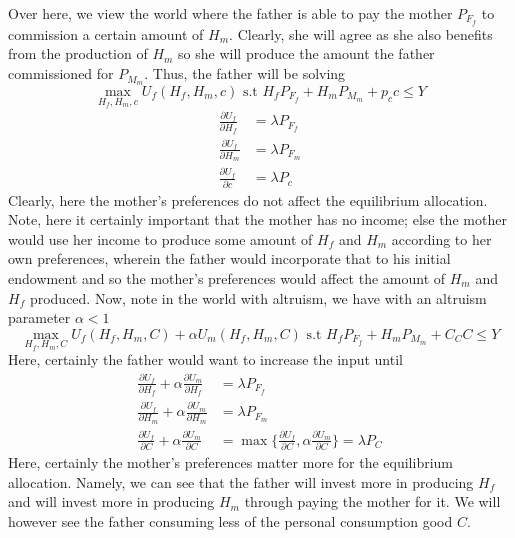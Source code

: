 \documentclass[12pt]{paper}
\begin{document}
Over here, we view the world where the father is able to pay the
mother $P_{F_f}$ to commission a certain amount of $H_m$. Clearly, she
will agree as she also benefits from the production of $H_m$ so she
will produce the amount the father commissioned for $P_{M_m}$. Thus, the
father will be solving
\begin{equation}
    \max_{H_f,H_m,c} U_f(H_f,H_m,c) \text{ s.t } H_f P_{F_f} + H_m P_{M_m} + p_c c \leq Y
\end{equation}
\begin{align*}
    \frac{\partial U_f}{\partial H_f} & = \lambda P_{F_f} \\
    \frac{\partial U_f}{\partial H_m} & = \lambda P_{F_m} \\
    \frac{\partial U_f}{\partial c}  & = \lambda P_{c}
\end{align*}
Clearly, here the mother's preferences do not affect the equilibrium
allocation. Note, here it certainly important that the mother has no
income; else the mother would use her income to produce some amount of
$H_f$ and $H_m$ according to her own preferences, wherein the father
would incorporate that to his initial endowment and so the mother's
preferences would affect the amount of $H_m$ and $H_f$ produced.  Now,
note in the world with altruism, we have with an altruism parameter
$\alpha<1$
\begin{equation}
  \max_{H_f,H_m,C} U_f(H_f,H_m,C)  + \alpha U_m(H_f,H_m,C) \text{ s.t  }  H_f P_{F_f} + H_m P_{M_m} + C_C C \leq Y
\end{equation}
Here, certainly the father would want to increase the input until
\begin{align*}
    \frac{\partial U_f}{\partial H_f} + \alpha  \frac{\partial U_m}{\partial H_f} & = \lambda P_{F_f} \\
    \frac{\partial U_f}{\partial H_m} + \alpha  \frac{\partial U_m}{\partial H_m} & = \lambda P_{F_m} \\
    \frac{\partial U_f}{\partial C} + \alpha  \frac{\partial U_m}{\partial C} & = \max\{\frac{\partial U_f}{\partial C},\alpha \frac{\partial U_m}{\partial C}\} = \lambda P_{C}
\end{align*}
Here, certainly the mother's preferences matter more for the
equilibrium allocation. Namely, we can see that the father will invest
more in producing $H_f$ and will invest more in producing $H_m$
through paying the mother for it. We will however see the father
consuming less of the personal consumption good $C$.
\end{document}

